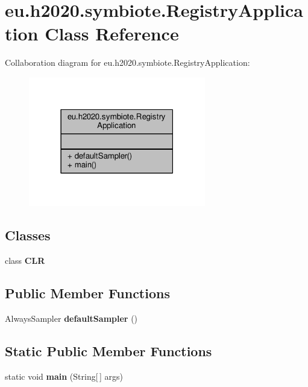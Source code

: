 \hypertarget{classeu_1_1h2020_1_1symbiote_1_1RegistryApplication}{}\section{eu.\+h2020.\+symbiote.\+Registry\+Application Class Reference}
\label{classeu_1_1h2020_1_1symbiote_1_1RegistryApplication}


Collaboration diagram for eu.\+h2020.\+symbiote.\+Registry\+Application\+:
\nopagebreak
\begin{figure}[H]
\begin{center}
\leavevmode
\includegraphics[width=219pt]{classeu_1_1h2020_1_1symbiote_1_1RegistryApplication__coll__graph}
\end{center}
\end{figure}
\subsection*{Classes}
\begin{DoxyCompactItemize}
\item 
class {\bfseries C\+LR}
\end{DoxyCompactItemize}
\subsection*{Public Member Functions}
\begin{DoxyCompactItemize}
\item 
Always\+Sampler {\bfseries default\+Sampler} ()\hypertarget{classeu_1_1h2020_1_1symbiote_1_1RegistryApplication_afd4955b603a321eda1a9b8138093839b}{}\label{classeu_1_1h2020_1_1symbiote_1_1RegistryApplication_afd4955b603a321eda1a9b8138093839b}

\end{DoxyCompactItemize}
\subsection*{Static Public Member Functions}
\begin{DoxyCompactItemize}
\item 
static void {\bfseries main} (String\mbox{[}$\,$\mbox{]} args)\hypertarget{classeu_1_1h2020_1_1symbiote_1_1RegistryApplication_a5ffab7a5e414dd85a6da531224e1501c}{}\label{classeu_1_1h2020_1_1symbiote_1_1RegistryApplication_a5ffab7a5e414dd85a6da531224e1501c}

\end{DoxyCompactItemize}


